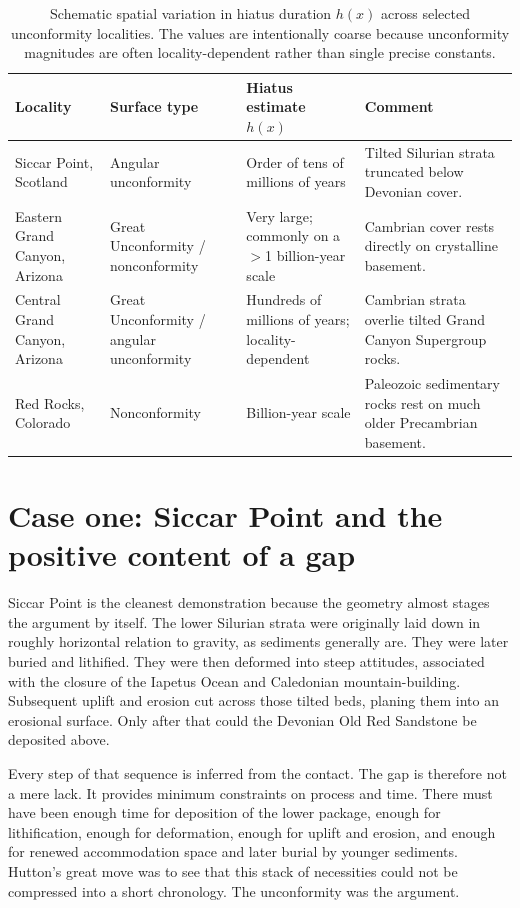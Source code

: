\documentclass[11pt]{article}
\begin{document}
\begin{table}[h]
\centering
\begin{tabular}{p{3.1cm}p{3.1cm}p{3.6cm}p{4.3cm}}
\textbf{Locality} & \textbf{Surface type} & \textbf{Hiatus estimate $h(x)$} & \textbf{Comment}\\
\hline
Siccar Point, Scotland & Angular unconformity & Order of tens of millions of years & Tilted Silurian strata truncated below Devonian cover.\\
Eastern Grand Canyon, Arizona & Great Unconformity / nonconformity & Very large; commonly on a $>$1 billion-year scale & Cambrian cover rests directly on crystalline basement.\\
Central Grand Canyon, Arizona & Great Unconformity / angular unconformity & Hundreds of millions of years; locality-dependent & Cambrian strata overlie tilted Grand Canyon Supergroup rocks.\\
Red Rocks, Colorado & Nonconformity & Billion-year scale & Paleozoic sedimentary rocks rest on much older Precambrian basement.\\
\end{tabular}
\caption{Schematic spatial variation in hiatus duration $h(x)$ across selected unconformity localities. The values are intentionally coarse because unconformity magnitudes are often locality-dependent rather than single precise constants.}
\end{table}

\section{Case one: Siccar Point and the positive content of a gap}
Siccar Point is the cleanest demonstration because the geometry almost stages the argument by itself. The lower Silurian strata were originally laid down in roughly horizontal relation to gravity, as sediments generally are. They were later buried and lithified. They were then deformed into steep attitudes, associated with the closure of the Iapetus Ocean and Caledonian mountain-building. Subsequent uplift and erosion cut across those tilted beds, planing them into an erosional surface. Only after that could the Devonian Old Red Sandstone be deposited above.

Every step of that sequence is inferred from the contact. The gap is therefore not a mere lack. It provides minimum constraints on process and time. There must have been enough time for deposition of the lower package, enough for lithification, enough for deformation, enough for uplift and erosion, and enough for renewed accommodation space and later burial by younger sediments. Hutton's great move was to see that this stack of necessities could not be compressed into a short chronology. The unconformity was the argument.
\end{document}
